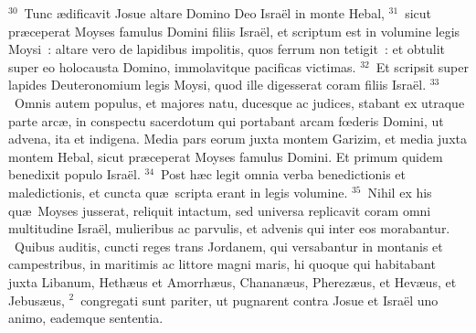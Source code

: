 ${}^{30}$~Tunc \ae dificavit Josue altare Domino Deo Isra\"el in monte Hebal,
${}^{31}$~sicut pr\ae ceperat Moyses famulus Domini filiis Isra\"el, et scriptum est in volumine legis Moysi~: altare vero de lapidibus impolitis, quos ferrum non tetigit~: et obtulit super eo holocausta Domino, immolavitque pacificas victimas.
${}^{32}$~Et scripsit super lapides Deuteronomium legis Moysi, quod ille digesserat coram filiis Isra\"el.
${}^{33}$~Omnis autem populus, et majores natu, ducesque ac judices, stabant ex utraque parte arc\ae , in conspectu sacerdotum qui portabant arcam fœderis Domini, ut advena, ita et indigena. Media pars eorum juxta montem Garizim, et media juxta montem Hebal, sicut pr\ae ceperat Moyses famulus Domini. Et primum quidem benedixit populo Isra\"el.
${}^{34}$~Post h\ae c legit omnia verba benedictionis et maledictionis, et cuncta qu\ae\ scripta erant in legis volumine.
${}^{35}$~Nihil ex his qu\ae\ Moyses jusserat, reliquit intactum, sed universa replicavit coram omni multitudine Isra\"el, mulieribus ac parvulis, et advenis qui inter eos morabantur.
~\lettrine[lines=10,image=true,loversize=0.05,lraise=-0.03]{Q}{}uibus auditis, cuncti reges trans Jordanem, qui versabantur in montanis et campestribus, in maritimis ac littore magni maris, hi quoque qui habitabant juxta Libanum, Heth\ae us et Amorrh\ae us, Chanan\ae us, Pherez\ae us, et Hev\ae us, et Jebus\ae us,
${}^{2}$~congregati sunt pariter, ut pugnarent contra Josue et Isra\"el uno animo, eademque sententia.



